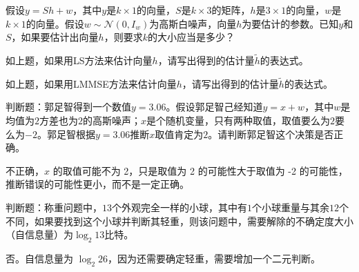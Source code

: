 \begin{problem}
	假设$y=Sh+w$，其中$y$是$k\times 1$的向量，$S$是$k\times 3$的矩阵，$h$是$3\times 1$的向量，$w$是$k\times 1$的向量。假设$w\sim\mathcal{N}(0,I_w)$为高斯白噪声，向量$h$为要估计的参数。已知$y$和$S$，如果要估计出向量$h$，则要求$k$的大小应当是多少？
\end{problem}
\begin{solution}
	
\end{solution}



\begin{problem}
	如上题，如果用LS方法来估计向量$h$，请写出得到的估计量$\tilde{h}$的表达式。
\end{problem}
\begin{solution}
	
\end{solution}



\begin{problem}
	如上题，如果用LMMSE方法来估计向量$h$，请写出得到的估计量$\tilde{h}$的表达式。
\end{problem}
\begin{solution}
	
\end{solution}



\begin{problem}
	判断题：郭足智得到一个数值$y=3.06$。假设郭足智己经知道$y=x+w$，其中$w$是均值为$2$方差也为$2$的高斯噪声；$x$是个随机变量，只有两种取值，取值要么为$2$要么为$-2$。郭足智根据$y=3.06$推断$x$取值肯定为$2$。请判断郭足智这个决策是否正确。
\end{problem}
\begin{solution}
	不正确，$x$ 的取值可能不为 2，只是取值为 2 的可能性大于取值为 -2 的可能性，推断错误的可能性更小，而不是一定正确。
\end{solution}



\begin{problem}
	判断题：称重问题中，$13$个外观完全一样的小球，其中有$1$个小球重量与其余$12$个不同，如果要找到这个小球并判断其轻重，则该问题中，需要解除的不确定度大小（自信息量）为$\log_2 13$比特。
\end{problem}
\begin{solution}
	否。自信息量为 $\log_2 26$，因为还需要确定轻重，需要增加一个二元判断。
\end{solution}



